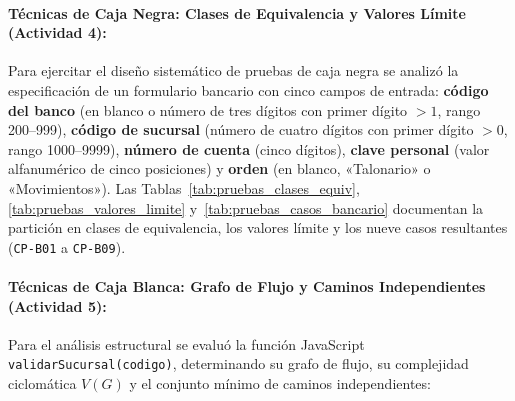 \documentclass[12pt,a4paper]{article}
\begin{document}


\paragraph{Técnicas de Caja Negra: Clases de Equivalencia y Valores Límite (Actividad 4):}
Para ejercitar el diseño sistemático de pruebas de caja negra se analizó la especificación de un formulario bancario con cinco campos de entrada: \textbf{código del banco} (en blanco o número de tres dígitos con primer dígito $> 1$, rango 200--999), \textbf{código de sucursal} (número de cuatro dígitos con primer dígito $> 0$, rango 1000--9999), \textbf{número de cuenta} (cinco dígitos), \textbf{clave personal} (valor alfanumérico de cinco posiciones) y \textbf{orden} (en blanco, «Talonario» o «Movimientos»). Las Tablas~\ref{tab:pruebas_clases_equiv}, \ref{tab:pruebas_valores_limite} y~\ref{tab:pruebas_casos_bancario} documentan la partición en clases de equivalencia, los valores límite y los nueve casos resultantes (\texttt{CP-B01} a \texttt{CP-B09}).



\paragraph{Técnicas de Caja Blanca: Grafo de Flujo y Caminos Independientes (Actividad 5):}
Para el análisis estructural se evaluó la función JavaScript \texttt{validarSucursal(codigo)}, determinando su grafo de flujo, su complejidad ciclomática $V(G)$ y el conjunto mínimo de caminos independientes:
\end{document}
